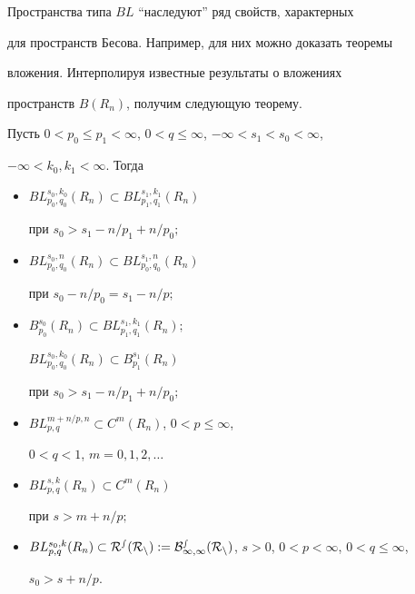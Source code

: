  


Пространства типа $BL$ ``наследуют'' ряд свойств, характерных 


для пространств Бесова. Например, для них можно доказать теоремы 


вложения. Интерполируя известные результаты о вложениях 


пространств $B(R_n)$, получим следующую теорему. 


 


\begin{thm} 


Пусть $0<p_0\le p_1<\infty$, $0<q\le\infty$, $-\infty<s_1<s_0<\infty$, 


$-\infty<k_0,k_1<\infty$. Тогда 


\begin{itemize} 


\item[а)] $BL^{s_0,k_0}_{p_0,q_0}(R_n)\subset 


BL^{s_1,k_1}_{p_1,q_1}(R_n)$ 


при $s_0>s_1-n/p_1+n/p_0;$ 


\item[б)] $BL^{s_0,n}_{p_0,q_0}(R_n)\subset 


BL^{s_1,n}_{p_0,q_0}(R_n)$ 


при $s_0-n/p_0=s_1-n/p;$ 


\item[в)] $B^{s_0}_{p_0}(R_n)\subset 


BL^{s_1,k_1}_{p_1,q_1}(R_n);$ 


$BL^{s_0,k_0}_{p_0,q_0}(R_n)\subset 


B^{s_1}_{p_1}(R_n)$ 


при $s_0>s_1-n/p_1+n/p_0;$ 


\item[г)] $BL^{m+n/p,n}_{p,q}\subset C^m(R_n)$, $0<p\le\infty$, 


$0<q<1$, $m=0,1,2,\dotsc$ 


\item[д)] $BL^{s,k}_{p,q}(R_n)\subset C^m(R_n)$ 


при $s>m+n/p;$ 


\item[е)] $BL^{s_0,k}_{p,q}(R_n)\subset\cal R^s(R_n):= 


B^s_{\infty,\infty}(R_n)$, $s>0$, $0<p<\infty$, $0<q\le\infty$, 


$s_0>s+n/p$. 


\end{itemize} 


\end{thm} 


